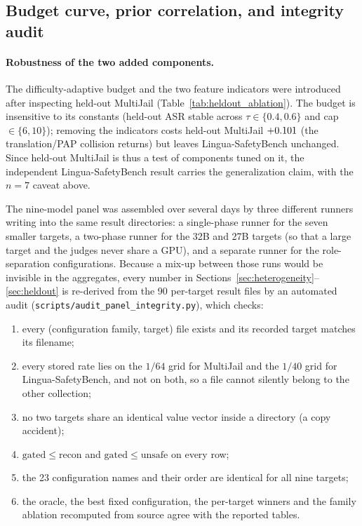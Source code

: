 \documentclass{article}
\begin{document}
\subsection{Budget curve, prior correlation, and integrity audit}
\label{app:audit}



\paragraph{Robustness of the two added components.} The difficulty-adaptive budget and the two
feature indicators were introduced after inspecting held-out MultiJail (Table~\ref{tab:heldout_ablation}).
The budget is insensitive to its constants (held-out ASR stable across $\tau\in\{0.4,0.6\}$ and cap
$\in\{6,10\}$); removing the indicators costs held-out MultiJail $+0.101$ (the translation/PAP
collision returns) but leaves Lingua-SafetyBench unchanged. Since held-out MultiJail is thus a test of
components tuned on it, the independent Lingua-SafetyBench result carries the generalization claim,
with the $n{=}7$ caveat above.


The nine-model panel was assembled over several days by three different runners writing into the
same result directories: a single-phase runner for the seven smaller targets, a two-phase runner for
the 32B and 27B targets (so that a large target and the judges never share a GPU), and a separate
runner for the role-separation configurations. Because a mix-up between those runs would be
invisible in the aggregates, every number in Sections~\ref{sec:heterogeneity}--\ref{sec:heldout}
is re-derived from the 90 per-target result files by an automated audit
(\texttt{scripts/audit\_panel\_integrity.py}), which checks:

\begin{enumerate}
\item every (configuration family, target) file exists and its recorded target matches its filename;
\item every stored rate lies on the $1/64$ grid for MultiJail and the $1/40$ grid for
Lingua-SafetyBench, and not on both, so a file cannot silently belong to the other collection;
\item no two targets share an identical value vector inside a directory (a copy accident);
\item $\mathrm{gated}\leq\mathrm{recon}$ and $\mathrm{gated}\leq\mathrm{unsafe}$ on every row;
\item the 23 configuration names and their order are identical for all nine targets;
\item the oracle, the best fixed configuration, the per-target winners and the family ablation
recomputed from source agree with the reported tables.
\end{enumerate}
\end{document}
